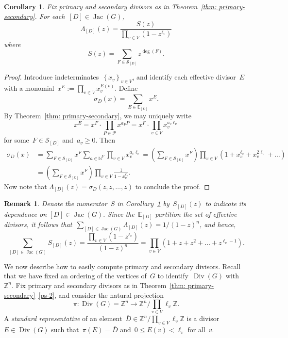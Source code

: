 \documentclass{amsart}
\newtheorem{cor}[thm]{Corollary}
\newtheorem{Remark}[thm]{Remark}
\newenvironment{remark}
  {\begin{Remark}\rm}{\end{Remark}}
\DeclareMathOperator{\Jac}{Jac}
\DeclareMathOperator{\Div}{Div}
\newcommand{\primary}{\mathcal{P}}
\newcommand{\secondary}{\mathcal{S}}
\newcommand{\Z}{\mathbb{Z}}
\newcommand{\N}{\mathbb{N}}
\newcommand{\E}{\mathbb{E}}
\newcommand{\tl}{\ell}
\begin{document}
\begin{cor}\label{cor: ps-genfun} Fix primary and secondary divisors as in Theorem~\ref{thm:
  primary-secondary}. For each~$[D]\in\Jac(G)$,
  \[
    \Lambda_{[D]}(z)=\frac{S(z)}{\prod_{v\in V}\left(1-z^{\tl_v}\right)}
  \]
  where
  \[
    S(z)=\sum_{F\in\secondary_{[D]}}z^{\deg(F)}.
  \]
\end{cor}
\begin{proof} Introduce indeterminates~$\left\{ x_v \right\}_{v\in V}$, and
  identify each effective divisor~$E$ with a monomial~$x^E:=\prod_{v\in
  V}x_v^{E(v)}$. Define
  \[
    \sigma_D(x)=\sum_{E\in\E_{[D]}}x^{E}.
  \]
  By Theorem~\ref{thm: primary-secondary}, we may uniquely write
  \[
    x^E=x^F\cdot\prod_{P\in\primary}x^{a_PP} =x^F\cdot\prod_{v\in V}x_v^{a_v\tl_v}
  \]
  for some~$F\in\secondary_{[D]}$ and~$a_v\geq0$.
  Then
\begin{align*}
\sigma_D(x)&=\sum_{F\in\secondary_{[D]}}x^F\sum_{a\in \N^V}\prod_{v\in
V}x_v^{a_v\tl_v}
=\left(\sum_{F\in\secondary_{[D]}}x^F\right)\prod_{v\in
V}\left(1+x_v^{\tl_v}+x_v^{2\tl_v}
+\dots\right)\\[8pt]
&=\left(\sum_{F\in\secondary_{[D]}}x^F\right)\prod_{v\in
V}\frac{1}{1-x_v^{\tl_v}}.
\end{align*}
Now note that $\Lambda_{[D]}(z)=\sigma_D(z,z,\dots,z)$ to conclude the proof.
\end{proof}

\begin{remark}\label{remark: ps-comp}  Denote the numerator~$S$ in Corollary~\ref{cor: ps-genfun}
  by~$S_{[D]}(z)$ to indicate its dependence on $[D]\in\Jac(G)$.  Since
  the~$\E_{[D]}$ partition the set of effective divisors, it follows
  that~$\sum_{[D]\in\Jac(G)}\Lambda_{[D]}(z)=1/(1-z)^n$, and hence,
  \[
    \sum_{[D]\in\Jac(G)}S_{[D]}(z)=\frac{\prod_{v\in V}(1-z^{\tl_v})}{(1-z)^n}=\prod_{v\in
      V}(1+z+z^2+\dots+z^{\tl_v-1}).
  \]
\end{remark}

We now describe how to easily compute primary and secondary divisors. 
Recall that we have fixed an ordering of the vertices of~$G$ to identify~$\Div(G)$
with~$\Z^n$.  Fix primary and secondary divisors as in
Theorem~\ref{thm: primary-secondary}~\ref{ps-2}, and consider the natural projection
\[
  \pi\colon \Div(G)=\Z^n\to\Z^n/\prod_{v\in V}\tl_v\Z.
\]
A {\em standard representative} of an element~$\overline{D}\in\Z^n/\prod_{v\in
V}\tl_v\Z$ is a divisor~$E\in\Div(G)$ such that~$\pi(E)=\overline{D}$ and~$0\leq
E(v)<\tl_v$ for all~$v$.  
\end{document}
